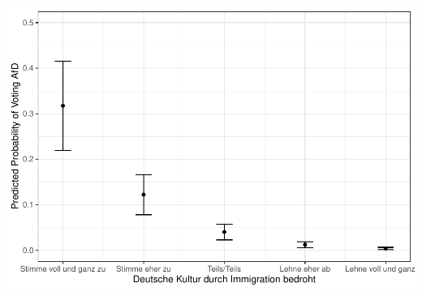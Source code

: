 \documentclass[
]{article}
\begin{document}
\includegraphics{AVCD_Final_Assignment-Edenhofer_latest_files/figure-latex/afd-immig-culture-threat-1.pdf}
\end{document}
